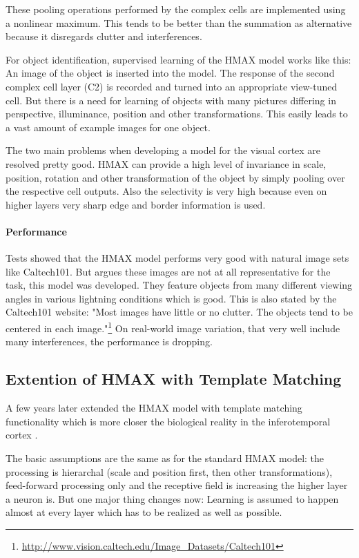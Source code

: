 			These pooling operations performed by the complex cells are implemented using a nonlinear maximum. This tends to be better than the summation as alternative because it disregards clutter and interferences.
			
			For object identification, supervised learning of the HMAX model works like this: An image of the object is inserted into the model. The response of the second complex cell layer (C2) is recorded and turned into an appropriate view-tuned cell. But there is a need for learning of objects with many pictures differing in perspective, illuminance, position and other transformations. This easily leads to a vast amount of example images for one object.
			
			The two main problems when developing a model for the visual cortex are resolved pretty good. HMAX can provide a high level of invariance in scale, position, rotation and other transformation of the object by simply pooling over the respective cell outputs. Also the selectivity is very high because even on higher layers very sharp edge and border information is used.
			
			\paragraph{Performance} Tests showed that the HMAX model performs very good with natural image sets like Caltech101. But \citep{pinto2008real} argues these images are not at all representative for the task, this model was developed. They feature objects from many different viewing angles in various lightning conditions which is good. This is also stated by the Caltech101 website: "Most images have little or no clutter. The objects tend to be centered in each image."\footnote{\url{http://www.vision.caltech.edu/Image_Datasets/Caltech101}} On real-world image variation, that very well include many interferences, the performance is dropping.
			
			
		\subsection{Extention of HMAX with Template Matching}
		
			A few years later \citeauthor{serre2007robust} extended the HMAX model with template matching functionality which is more closer the biological reality in the inferotemporal cortex \citep{poggio2004generalization}.
			
			The basic assumptions are the same as for the standard HMAX model: the processing is hierarchal (scale and position first, then other transformations), feed-forward processing only and the receptive field is increasing the higher layer a neuron is. But one major thing changes now: Learning is assumed to happen almost at every layer which has to be realized as well as possible.
			
